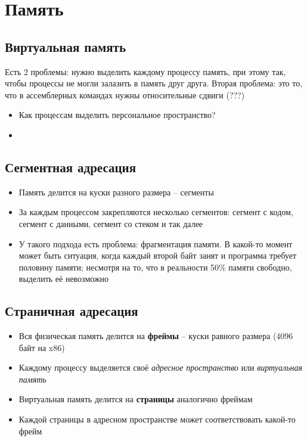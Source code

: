 \section{Память}
  \subsection{Виртуальная память}
    Есть 2 проблемы: нужно выделить каждому процессу память, при этому так, чтобы процессы не могли залазить в память друг друга. Вторая проблема: это то, что в ассемблерных командах нужны относительные сдвиги (???)
    \begin{itemize}
      \item Как процессам выделить персональное пространство?
      \item {}
    \end{itemize}
  
  \subsection{Сегментная адресация}
    \begin{itemize}
      \item Память делится на куски разного размера -- сегменты
      \item За каждым процессом закрепляются несколько сегментов: сегмент с кодом, сегмент с данными, сегмент со стеком и так далее
      \item У такого подхода есть проблема: фрагментация памяти. В какой-то момент может быть ситуация, когда каждый второй байт занят и программа требует половину памяти; несмотря на то, что в реальности 50\% памяти свободно, выделить её невозможно
    \end{itemize}
  
  \subsection{Страничная адресация}
    \begin{itemize}
      \item Вся физическая память делится на \textbf{фреймы} -- куски равного размера (4096 байт на x86)
      \item Каждому процессу выделяется своё \textit{адресное пространство} или \textit{виртуальная память}
      \item Виртуальная память делится на \textbf{страницы} аналогично фреймам
      \item Каждой страницы в адресном пространстве может соответствовать какой-то фрейм
    \end{itemize}
  
